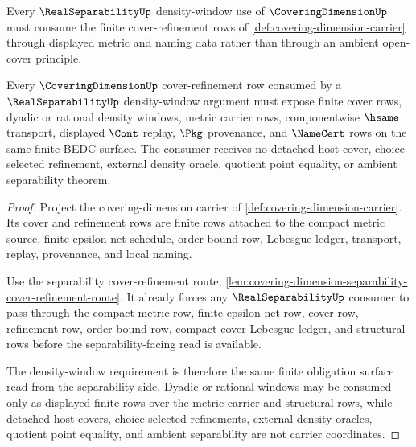 Every $\RealSeparabilityUp$ density-window use of $\CoveringDimensionUp$ must consume the finite cover-refinement rows of \autoref{def:covering-dimension-carrier} through displayed metric and naming data rather than through an ambient open-cover principle.

\begin{theorem}
\label{thm:coveringdimension-real-separability-cover-obligation}
Every $\CoveringDimensionUp$ cover-refinement row consumed by a $\RealSeparabilityUp$ density-window argument must expose finite cover rows, dyadic or rational density windows, metric carrier rows, componentwise $\hsame$ transport, displayed $\Cont$ replay, $\Pkg$ provenance, and $\NameCert$ rows on the same finite BEDC surface. The consumer receives no detached host cover, choice-selected refinement, external density oracle, quotient point equality, or ambient separability theorem.
\end{theorem}
\begin{proof}
Project the covering-dimension carrier of \autoref{def:covering-dimension-carrier}. Its cover and refinement rows are finite rows attached to the compact metric source, finite epsilon-net schedule, order-bound row, Lebesgue ledger, transport, replay, provenance, and local naming.

Use the separability cover-refinement route, \autoref{lem:covering-dimension-separability-cover-refinement-route}. It already forces any $\RealSeparabilityUp$ consumer to pass through the compact metric row, finite epsilon-net row, cover row, refinement row, order-bound row, compact-cover Lebesgue ledger, and structural rows before the separability-facing read is available.

The density-window requirement is therefore the same finite obligation surface read from the separability side. Dyadic or rational windows may be consumed only as displayed finite rows over the metric carrier and structural rows, while detached host covers, choice-selected refinements, external density oracles, quotient point equality, and ambient separability are not carrier coordinates.
\end{proof}

